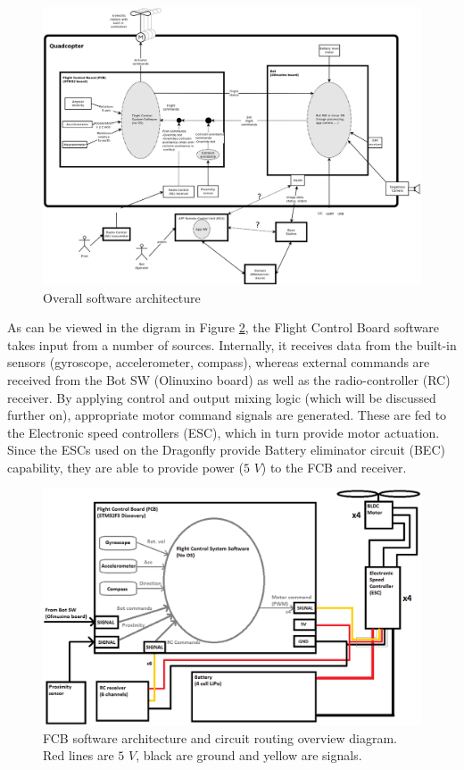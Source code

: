 \documentclass[a4paper]{report}
\begin{document}
\begin{figure}[h]
    \centering
    \includegraphics[scale=0.42]{images/high-level-sw-design.png}
    \caption{Overall software architecture}
    \label{fig:high-level-sw-arch}
\end{figure}

As can be viewed in the digram in Figure \ref{fig:fcb-sw-hw-arch}, the Flight Control Board software takes input from a number of sources. Internally, it receives data from the built-in sensors (gyroscope, accelerometer, compass), whereas external commands are received from the Bot SW (Olinuxino board) as well as the radio-controller (RC) receiver. By applying control and output mixing logic (which will be discussed further on), appropriate motor command signals are generated. These are fed to the Electronic speed controllers (ESC), which in turn provide motor actuation. Since the ESCs used on the Dragonfly provide Battery eliminator circuit (BEC) capability, they are able to provide power ($5$ $V$) to the FCB and receiver.

\begin{figure}[h]
    \centering
    \includegraphics[scale=0.42]{images/fcb-sw-hw-design.png}
    \caption{FCB software architecture and circuit routing overview diagram. Red lines are $5$ $V$, black are ground and yellow are signals.}
    \label{fig:fcb-sw-hw-arch}
\end{figure}
\end{document}

